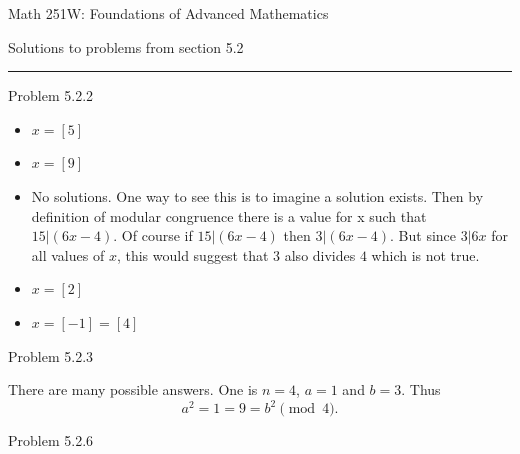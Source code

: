 \documentclass{article}
\theoremstyle{definition}
\begin{document}
	\begin{center}
		\Large{Math 251W: Foundations of Advanced Mathematics}

		\normalsize Solutions to problems from section 5.2 \hrule
		\vspace{0.4cm}

	\end{center}




	\noindent Problem 5.2.2  \vspace{0.3cm}

	\begin{itemize}
		\item[1.] $x=[5]$
		\item[2.] $x=[9]$
		\item[3.] No solutions. One way to see this is to imagine a solution exists. Then by definition of modular congruence there is a value for x such that $15|(6x-4)$. Of course if $15|(6x-4)$ then $3|(6x-4)$. But since $3|6x$ for all values of $x$, this would suggest that $3$ also divides $4$ which is not true.
		\item[4.] $x=[2]$
		\item[5.] $x=[-1]=[4]$
	\end{itemize}

	\vspace{1cm}



	\noindent Problem 5.2.3  \vspace{0.3cm}

	There are many possible answers. One is $n=4$, $a=1$ and $b=3$. Thus $$a^2=1=9=b^2\pmod{4}.$$
	\vspace{1cm}






	\noindent Problem 5.2.6  \vspace{0.3cm}
\end{document}
